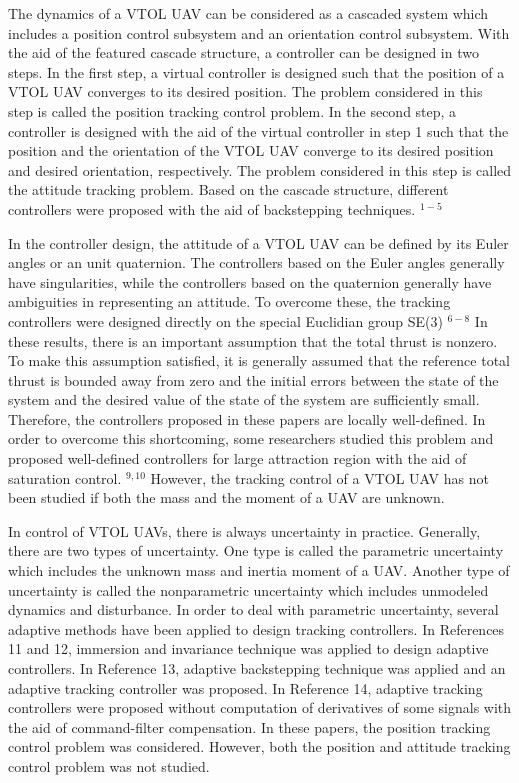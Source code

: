 \documentclass[10pt]{article}
\begin{document}
The dynamics of a VTOL UAV can be considered as a cascaded system which includes a position control subsystem and an orientation control subsystem. With the aid of the featured cascade structure, a controller can be designed in two steps. In the first step, a virtual controller is designed such that the position of a VTOL UAV converges to its desired position. The problem considered in this step is called the position tracking control problem. In the second step, a controller is designed with the aid of the virtual controller in step 1 such that the position and the orientation of the VTOL UAV converge to its desired position and desired orientation, respectively. The problem considered in this step is called the attitude tracking problem. Based on the cascade structure, different controllers were proposed with the aid of backstepping techniques. ${ }^{1-5}$

In the controller design, the attitude of a VTOL UAV can be defined by its Euler angles or an unit quaternion. The controllers based on the Euler angles generally have singularities, while the controllers based on the quaternion generally have ambiguities in representing an attitude. To overcome these, the tracking controllers were designed directly on the special Euclidian group SE(3) ${ }^{6-8}$ In these results, there is an important assumption that the total thrust is nonzero. To make this assumption satisfied, it is generally assumed that the reference total thrust is bounded away from zero and the initial errors between the state of the system and the desired value of the state of the system are sufficiently small. Therefore, the controllers proposed in these papers are locally well-defined. In order to overcome this shortcoming, some researchers studied this problem and proposed well-defined controllers for large attraction region with the aid of saturation control. ${ }^{9,10}$ However, the tracking control of a VTOL UAV has not been studied if both the mass and the moment of a UAV are unknown.

In control of VTOL UAVs, there is always uncertainty in practice. Generally, there are two types of uncertainty. One type is called the parametric uncertainty which includes the unknown mass and inertia moment of a UAV. Another type of uncertainty is called the nonparametric uncertainty which includes unmodeled dynamics and disturbance. In order to deal with parametric uncertainty, several adaptive methods have been applied to design tracking controllers. In References 11 and 12, immersion and invariance technique was applied to design adaptive controllers. In Reference 13, adaptive backstepping technique was applied and an adaptive tracking controller was proposed. In Reference 14, adaptive tracking controllers were proposed without computation of derivatives of some signals with the aid of command-filter compensation. In these papers, the position tracking control problem was considered. However, both the position and attitude tracking control problem was not studied.
\end{document}
